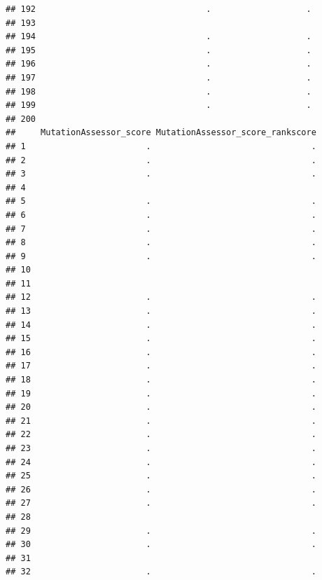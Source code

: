 \documentclass[
]{article}
\begin{document}
\begin{verbatim}
## 192                                  .                   .
## 193                                                       
## 194                                  .                   .
## 195                                  .                   .
## 196                                  .                   .
## 197                                  .                   .
## 198                                  .                   .
## 199                                  .                   .
## 200                                                       
##     MutationAssessor_score MutationAssessor_score_rankscore
## 1                        .                                .
## 2                        .                                .
## 3                        .                                .
## 4                                                          
## 5                        .                                .
## 6                        .                                .
## 7                        .                                .
## 8                        .                                .
## 9                        .                                .
## 10                                                         
## 11                                                         
## 12                       .                                .
## 13                       .                                .
## 14                       .                                .
## 15                       .                                .
## 16                       .                                .
## 17                       .                                .
## 18                       .                                .
## 19                       .                                .
## 20                       .                                .
## 21                       .                                .
## 22                       .                                .
## 23                       .                                .
## 24                       .                                .
## 25                       .                                .
## 26                       .                                .
## 27                       .                                .
## 28                                                         
## 29                       .                                .
## 30                       .                                .
## 31                                                         
## 32                       .                                .

\end{verbatim}
\end{document}
